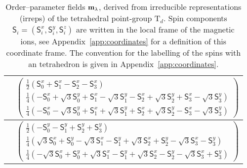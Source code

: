 \documentclass[apsrev4-1,prx,superscriptaddress,floatfix,twocolumn,longbibliography]{revtex4-1}
\begin{document}
\begin{appendix}
\begin{table}
{\begin{tabular}{ | c | c |  }
\multirow{1}{*}{}
   ${\bf m}_{\sf T_{1, planar}}$  & 
   $\begin{pmatrix}
        \frac{1}{2} \left(  \mathsf{S}^x_0 + \mathsf{S}^x_1 - \mathsf{S}^x_2  - \mathsf{S}^x_3 \right)  \\
        \frac{1}{4} \left( - \mathsf{S}^x_0 + \sqrt{3} \mathsf{S}^y_0 +  \mathsf{S}^x_1 - \sqrt{3} \mathsf{S}^y_1
                              -  \mathsf{S}^x_2 + \sqrt{3} \mathsf{S}^y_2 +  \mathsf{S}^x_3 - \sqrt{3} \mathsf{S}^y_3 \right)   \\
        \frac{1}{4} \left(  - \mathsf{S}^x_0 - \sqrt{3} \mathsf{S}^y_0 +  \mathsf{S}^x_1 + \sqrt{3} \mathsf{S}^y_1
                              +  \mathsf{S}^x_2 + \sqrt{3} \mathsf{S}^y_2 -  \mathsf{S}^x_3 - \sqrt{3} \mathsf{S}^y_3 \right)  
   \end{pmatrix}$ 
\\
\hline
\multirow{1}{*}{}
   ${\bf m}_{\sf T_2} $ & 
   $\begin{pmatrix}
        \frac{1}{2} 
        \left(
                -\mathsf{S}_0^y-\mathsf{S}_1^y+\mathsf{S}_2^y+\mathsf{S}_3^y 
        \right) 
        \\
        \frac{1}{4} 
        \left(
        \sqrt 3  \mathsf{S}_0^x + \mathsf{S}_0^y - \sqrt 3 \mathsf{S}_1^x - \mathsf{S}_1^y + \sqrt 3 \mathsf{S}_2^x + \mathsf{S}_2^y - 
 \sqrt 3 \mathsf{S}_3^x - \mathsf{S}_3^y
        \right) \\
        \frac{1}{4} 
        \left(
       - \sqrt 3  \mathsf{S}_0^x + \mathsf{S}_0^y + \sqrt 3 \mathsf{S}_1^x - \mathsf{S}_1^y + \sqrt 3 \mathsf{S}_2^x - \mathsf{S}_2^y - 
 \sqrt 3 \mathsf{S}_3^x + \mathsf{S}_3^y
        \right)
      \end{pmatrix} $    
\\ 
\hline
\end{tabular}}
\caption{
Order--parameter fields ${\bf m}_\lambda$, derived from irreducible representations (irreps)
of the tetrahedral point-group T$_d$.   
%
Spin components $\mathsf{S}_i = (\mathsf{S}^x_i, \mathsf{S}^y_i, \mathsf{S}^z_i)$ 
are written in the local frame of the magnetic ions, see Appendix~\ref{app:coordinates}
for a definition of this coordinate frame.
%
The convention for the labelling of the spins with an tetrahedron is 
given in  Appendix~\ref{app:coordinates}.
}
\label{table:m.lambda}
\end{table}


\end{appendix}
\end{document}
